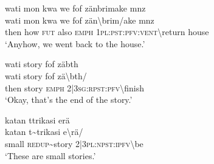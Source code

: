\ea\label{ex:12:a817}
wati mon kwa we fof zänbrimake mnz\\
\gll wati	mon	kwa	we	fof	zän{\textbackslash}brim/ake	mnz\\
     then	how	\textsc{fut}	also	\textsc{emph}	1\textsc{pl}:\textsc{pst}:\textsc{pfv}:\textsc{vent}{\textbackslash}return	house\\
\glt `Anyhow, we went back to the house.'
\z

\ea\label{ex:12:a821}
wati story fof zäbth\\
\gll wati	story	fof	zä{\textbackslash}bth/\\
     then	story	\textsc{emph}	2|3\textsc{sg}:\textsc{rpst}:\textsc{pfv}{\textbackslash}finish\\
\glt `Okay, that's the end of the story.'
\z

\ea\label{ex:12:a824}
katan ttrikasi erä\\
\gll katan	t{\textasciitilde}trikasi	e{\textbackslash}rä/\\
     small	\textsc{redup}{\textasciitilde}story	2|3\textsc{pl}:\textsc{npst}:\textsc{ipfv}{\textbackslash}be\\
\glt `These are small stories.'
\z
